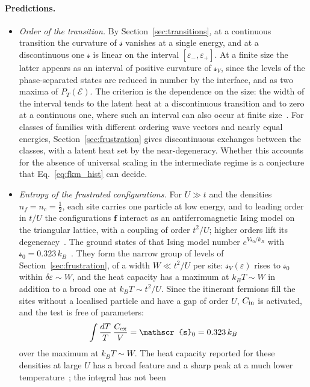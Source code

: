 \documentclass[10pt,a4paper]{article}
\theoremstyle{plain}
\newcommand{\enrg}{\mathcal{E}}  %
\newcommand{\lds}{\mathscr{s}}  %
\begin{document}
\paragraph{Predictions.}
\begin{itemize}\setlength{\itemsep}{2pt}
\item \emph{Order of the transition.} By Section~\ref{sec:transitions}, at a
  continuous transition the curvature of $\lds$ vanishes at a single energy,
  and at a discontinuous one $\lds$ is linear on the interval
  $[\varepsilon_-,\varepsilon_+]$. At a finite size the latter appears as an
  interval of positive curvature of $\lds_V$, since the levels of the
  phase-separated states are reduced in number by the interface, and as two
  maxima of $P_T(\enrg)$. The criterion is the dependence on the size: the
  width of the interval tends to the latent heat at a discontinuous
  transition and to zero at a continuous one, where such an interval can
  also occur at finite size~\cite{Behringer2006}. For classes of families
  with different ordering wave vectors and nearly equal energies,
  Section~\ref{sec:frustration} gives discontinuous exchanges between the
  classes, with a latent heat set by the near-degeneracy. Whether this
  accounts for the absence of universal scaling in the intermediate regime
  is a conjecture that Eq.~\eqref{eq:fkm_hist} can decide.
\item \emph{Entropy of the frustrated configurations.} For $U\gg t$ and the
  densities $n_f=n_c=\tfrac12$, each site carries one particle at low
  energy, and to leading order in $t/U$ the configurations $\mathbf f$
  interact as an antiferromagnetic Ising model on the triangular lattice,
  with a coupling of order $t^{2}/U$; higher orders lift its
  degeneracy~\cite{NejatiLenk2026}. The ground states of that Ising model
  number $e^{V\lds_0/k_B}$ with
  $\lds_0=0.323\,k_B$~\cite{Wannier1950}. They form the narrow group of
  levels of Section~\ref{sec:frustration}, of a width $W\ll t^{2}/U$ per
  site: $\lds_V(\varepsilon)$ rises to $\lds_0$ within
  $\delta\varepsilon\sim W$, and the heat capacity has a maximum at
  $k_BT\sim W$ in addition to a broad one at $k_BT\sim t^{2}/U$. Since the
  itinerant fermions fill the sites without a localised particle and have a
  gap of order $U$, $C_{\rm in}$ is activated, and the test is free of
  parameters:
  \[
    \int\frac{dT}{T}\,\frac{C_{\rm ex}}{V}=\lds_0=0.323\,k_B
  \]
  over the maximum at $k_BT\sim W$. The heat capacity reported for these
  densities at large $U$ has a broad feature and a sharp peak at a much
  lower temperature~\cite{NejatiLenk2026}; the integral has not been

\end{itemize}
\end{document}
